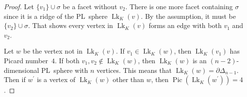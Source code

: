 \documentclass[10pt,a4paper]{amsart}
\DeclareMathOperator{\Lk}{Lk}
\DeclareMathOperator{\Pic}{Pic}
\begin{document}
\begin{proof}
	Let $\{v_1\} \cup \sigma$ be a facet without $v_2$.
	There is one more facet containing $\sigma$ since it is a ridge of the PL~sphere $\Lk_K(v)$.
	By the assumption, it must be $\{v_2\} \cup \sigma$.
	That shows every vertex in $\Lk_K(v)$ forms an edge with both $v_1$ and $v_2$.
	
	Let $w$ be the vertex not in $\Lk_K(v)$.
	If $v_1 \in \Lk_K(w)$, then $\Lk_K(v_1)$ has Picard number~$4$.
	If both $v_1, v_2 \not\in \Lk_K(w)$, then $\Lk_K(w)$ is an $(n-2)$-dimensional PL~sphere with $n$ vertices.
    This means that $\Lk_K(w) = \partial\Delta_{n-1}$.
    Then if $w^\prime$ is a vertex of $\Lk_K(w)$ other than $w$, then $\Pic(\Lk_K(w^\prime)) = 4$.
\end{proof}
\end{document}
